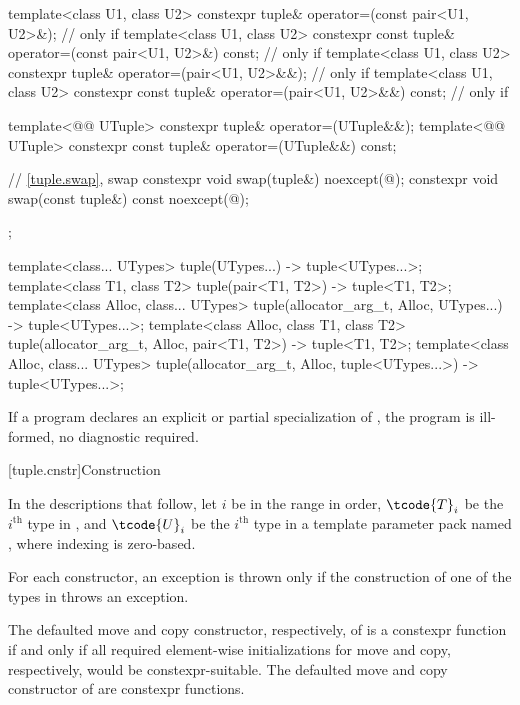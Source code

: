 \begin{codeblock}
{{    template<class U1, class U2>
      constexpr tuple& operator=(const pair<U1, U2>&);          // only if 
    template<class U1, class U2>
      constexpr const tuple& operator=(const pair<U1, U2>&) const;
                                                                // only if 
    template<class U1, class U2>
      constexpr tuple& operator=(pair<U1, U2>&&);               // only if 
    template<class U1, class U2>
      constexpr const tuple& operator=(pair<U1, U2>&&) const;   // only if 

    template<@@ UTuple>
      constexpr tuple& operator=(UTuple&&);
    template<@@ UTuple>
      constexpr const tuple& operator=(UTuple&&) const;

    // \ref{tuple.swap},  swap
    constexpr void swap(tuple&) noexcept(@\seebelow@);
    constexpr void swap(const tuple&) const noexcept(@\seebelow@);
  };

  template<class... UTypes>
    tuple(UTypes...) -> tuple<UTypes...>;
  template<class T1, class T2>
    tuple(pair<T1, T2>) -> tuple<T1, T2>;
  template<class Alloc, class... UTypes>
    tuple(allocator_arg_t, Alloc, UTypes...) -> tuple<UTypes...>;
  template<class Alloc, class T1, class T2>
    tuple(allocator_arg_t, Alloc, pair<T1, T2>) -> tuple<T1, T2>;
  template<class Alloc, class... UTypes>
    tuple(allocator_arg_t, Alloc, tuple<UTypes...>) -> tuple<UTypes...>;
}
\end{codeblock}

\pnum
If a program declares an explicit or partial specialization of ,
the program is ill-formed, no diagnostic required.

[tuple.cnstr]{Construction}

\pnum
In the descriptions that follow, let $i$ be in the range
 in order, $\tcode{T}_i$
be the $i^\text{th}$ type in , and
$\tcode{U}_i$ be the $i^\text{th}$ type in a template parameter pack named , where indexing
is zero-based.

\pnum
For each  constructor, an exception is thrown only if the construction of
one of the types in  throws an exception.

\pnum
The defaulted move and copy constructor, respectively, of
 is a constexpr function if and only if all
required element-wise initializations for move and copy, respectively,
would be constexpr-suitable.
The defaulted move and copy constructor of  are
constexpr functions.

